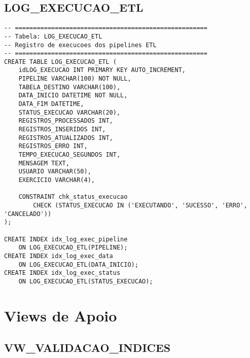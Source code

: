 \documentclass[12pt,a4paper]{article}
\begin{document}
\subsection{LOG\_EXECUCAO\_ETL}

\begin{lstlisting}
-- =====================================================
-- Tabela: LOG_EXECUCAO_ETL
-- Registro de execucoes dos pipelines ETL
-- =====================================================
CREATE TABLE LOG_EXECUCAO_ETL (
    idLOG_EXECUCAO INT PRIMARY KEY AUTO_INCREMENT,
    PIPELINE VARCHAR(100) NOT NULL,
    TABELA_DESTINO VARCHAR(100),
    DATA_INICIO DATETIME NOT NULL,
    DATA_FIM DATETIME,
    STATUS_EXECUCAO VARCHAR(20),
    REGISTROS_PROCESSADOS INT,
    REGISTROS_INSERIDOS INT,
    REGISTROS_ATUALIZADOS INT,
    REGISTROS_ERRO INT,
    TEMPO_EXECUCAO_SEGUNDOS INT,
    MENSAGEM TEXT,
    USUARIO VARCHAR(50),
    EXERCICIO VARCHAR(4),
    
    CONSTRAINT chk_status_execucao 
        CHECK (STATUS_EXECUCAO IN ('EXECUTANDO', 'SUCESSO', 'ERRO', 'CANCELADO'))
);

CREATE INDEX idx_log_exec_pipeline 
    ON LOG_EXECUCAO_ETL(PIPELINE);
CREATE INDEX idx_log_exec_data 
    ON LOG_EXECUCAO_ETL(DATA_INICIO);
CREATE INDEX idx_log_exec_status 
    ON LOG_EXECUCAO_ETL(STATUS_EXECUCAO);
\end{lstlisting}

\section{Views de Apoio}

\subsection{VW\_VALIDACAO\_INDICES}
\end{document}
